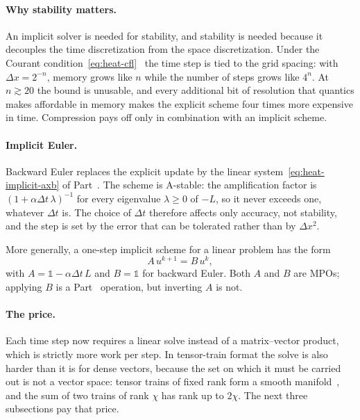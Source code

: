 \paragraph{Why stability matters.}
An implicit solver is needed for stability, and stability is needed because it
decouples the time discretization from the space discretization. Under the
Courant condition~\eqref{eq:heat-cfl}~\cite{Courant1928} the time step is tied
to the grid spacing: with $\Delta x = 2^{-n}$, memory grows like $n$ while the
number of steps grows like $4^{n}$. At $n \gtrsim 20$ the bound is unusable,
and every additional bit of resolution that quantics makes affordable in memory
makes the explicit scheme four times more expensive in time. Compression pays
off only in combination with an implicit scheme.

\paragraph{Implicit Euler.}
Backward Euler replaces the explicit update by the linear
system~\eqref{eq:heat-implicit-axb} of Part~. The scheme is A-stable: the amplification factor is
$(1 + \alpha \Delta t\, \lambda)^{-1}$ for every eigenvalue $\lambda \ge 0$ of
$-L$, so it never exceeds one, whatever $\Delta t$ is. The choice of $\Delta t$
therefore affects only accuracy, not stability, and the step is set by the error
that can be tolerated rather than by $\Delta x^2$.

More generally, a one-step implicit scheme for a linear problem has the form
\begin{equation}
  A\, u^{k+1} = B\, u^{k},
  \label{eq:one-step-scheme}
\end{equation}
with $A = \mathbb{1} - \alpha\Delta t\, L$ and $B = \mathbb{1}$ for backward
Euler. Both $A$ and $B$ are MPOs; applying $B$ is a Part~ operation,
but inverting $A$ is not.

\paragraph{The price.}
Each time step now requires a linear solve instead of a matrix--vector product,
which is strictly more work per step. In tensor-train format the solve is also
harder than it is for dense vectors, because the set on which it must be carried
out is not a vector space: tensor trains of fixed rank form a smooth
manifold~\cite{Holtz2012a}, and the sum of two trains of rank $\chi$ has rank up
to $2\chi$. The next three subsections pay that price.

